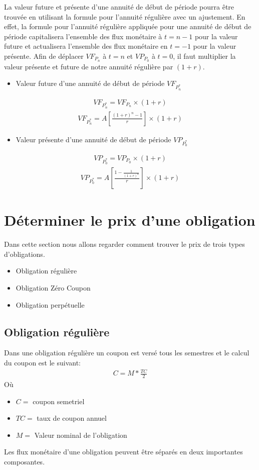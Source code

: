 \documentclass[letterpaper, 12pt]{article}
\newcommand{\1}{\mathds{1}}	%
\theoremstyle{definition}
\begin{document}
La valeur future et présente d'une annuité de début de période pourra être trouvée en utilisant la formule pour l'annuité régulière avec un ajustement. En effet, la formule pour l'annuité régulière appliquée pour une annuité de début de période capitalisera l'ensemble des flux monétaire à $t=n-1$ pour la valeur future et actualisera l'ensemble des flux monétaire en $t=-1$ pour la valeur présente. Afin de déplacer $VF_{P_n}$ à $t=n$ et $VP_{P_0}$ à $t=0$, il faut multiplier la valeur présente et future de notre annuité régulière par $(1+r)$.

\begin{itemize}
\item Valeur future d'une annuité de début de période $VF_{P_n^*}$
\end{itemize}
\begin{align*}
VF_{P_n^*}=VF_{P_n} \times (1+r)
\end{align*}
\begin{align*}
VF_{P_n^*}=A \left[\frac{(1+r)^n-1}{r} \right] \times (1+r)
\end{align*}

\begin{itemize}
\item Valeur présente d'une annuité de début de période $VP_{P_0^*}$
\end{itemize}
\begin{align*}
VP_{P_0^*}=VP_{P_0} \times (1+r)
\end{align*}
\begin{align*}
VP_{P_0^*}=A \left[ \frac{1-\frac{1}{(1+r)^n}}{r} \right] \times (1+r)
\end{align*}

\newpage
\section{Déterminer le prix d'une obligation}
Dans cette section nous allons regarder comment trouver le prix de trois types d'obligations.
\begin{itemize}
\item Obligation régulière 
\item Obligation Zéro Coupon
\item Obligation perpétuelle
\end{itemize}

\subsection{Obligation régulière}
Dans une obligation régulière un coupon est versé tous les semestres et le calcul du coupon est le suivant:
\begin{align*}
C= M * \frac{TC}{2}
\end{align*}
Où 
\begin{itemize}
\item $C=$ coupon semetriel 
\item $TC=$ taux de coupon annuel 
\item $M=$ Valeur nominal de l'obligation 
\end{itemize}
\vspace{1cm}
Les flux monétaire d'une obligation peuvent être séparés en deux importantes composantes. 
\end{document}
